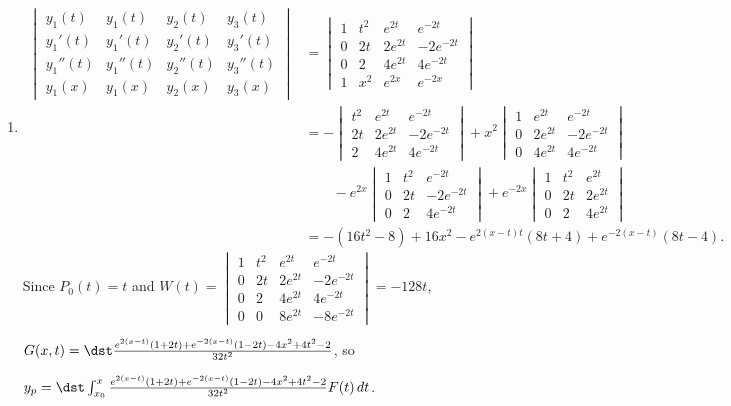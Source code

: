 \documentclass[openany]{book}
\newenvironment{sectionSolutions}{
 \begin{enumerate}[item-label={\thesection.\arabic{enumi}.}]
}{
 \end{enumerate}
}
\begin{document}
\begin{sectionSolutions}
\item
\begin{align*}
\begin{vmatrix}
y_1(t)&y_1(t)&y_2(t)&y_3(t)\\
y_1'(t)&y_1'(t)&y_2'(t)&y_3'(t)\\
y_1''(t)&y_1''(t)&y_2''(t)&y_3''(t)\\
y_1(x)&y_1(x)&y_2(x)&y_3(x)
\end{vmatrix}&=
\begin{vmatrix}
1&t^2&e^{2t}&e^{-2t}\\
0&2t&2e^{2t}&-2e^{-2t}\\
0&2&4e^{2t}&4e^{-2t}\\
1&x^2&e^{2x}&e^{-2x}
\end{vmatrix}\\
&=-\begin{vmatrix}t^2&e^{2t}&e^{-2t}\\
2t&2e^{2t}&-2e^{-2t}\\2&4e^{2t}&4e^{-2t}\end{vmatrix}
+x^2\begin{vmatrix}1&e^{2t}&e^{-2t}\\
0&2e^{2t}&-2e^{-2t}\\0&4e^{2t}&4e^{-2t}\end{vmatrix}\\
&\qquad-e^{2x}\begin{vmatrix}1&t^2&e^{-2t}\\
0&2t&-2e^{-2t}\\0&2&4e^{-2t}\end{vmatrix}
+e^{-2x}\begin{vmatrix}1&t^2&e^{2t}\\0&2t&2e^{2t}\\
0&2&4e^{2t}\end{vmatrix}\\
&=-(16t^2-8)+16x^2-e^{2(x-t)t}(8t+4)+e^{-2(x-t)}(8t-4).
\end{align*}
Since $P_0(t)=t$ and
$W(t)=\begin{vmatrix}
1&t^2&e^{2t}&e^{-2t}\\
0&2t&2e^{2t}&-2e^{-2t}\\
0&2&4e^{2t}&4e^{-2t}\\
0&0&8e^{2t}&-8e^{-2t}
\end{vmatrix}=-128t$,

$G(x,t)=\dst\frac{e^{2(x-t)}(1+2t)+e^{-2(x-t)}(1-2t)-4x^2+4t^2-2}{32t^2}$,
so

$y_p=\dst\int_{x_0}^x
\frac{e^{2(x-t)}(1+2t)+e^{-2(x-t)}(1-2t)-4x^2+4t^2-2}{32t^2}
F(t)\,dt$.
\end{sectionSolutions}
\end{document}
